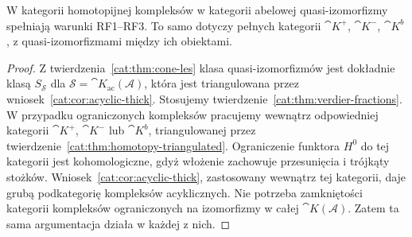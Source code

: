 \begin{wniosek}\label{cat:cor:quasi-iso-fractions}
W kategorii homotopijnej kompleksów w kategorii abelowej quasi-izomorfizmy spełniają warunki RF1--RF3. To samo dotyczy pełnych kategorii $\cat K^+$, $\cat K^-$, $\cat K^b$, z quasi-izomorfizmami między ich obiektami.
\end{wniosek}
\begin{proof}
Z twierdzenia~\ref{cat:thm:cone-les} klasa quasi-izomorfizmów jest dokładnie klasą $S_{\mathcal S}$ dla $\mathcal S=\cat K_{\mathrm{ac}}(\mathcal A)$, która jest triangulowana przez wniosek~\ref{cat:cor:acyclic-thick}. Stosujemy twierdzenie~\ref{cat:thm:verdier-fractions}. W przypadku ograniczonych kompleksów pracujemy wewnątrz odpowiedniej kategorii $\cat K^+$, $\cat K^-$ lub $\cat K^b$, triangulowanej przez twierdzenie~\ref{cat:thm:homotopy-triangulated}. Ograniczenie funktora $H^0$ do tej kategorii jest kohomologiczne, gdyż włożenie zachowuje przesunięcia i trójkąty stożków. Wniosek~\ref{cat:cor:acyclic-thick}, zastosowany wewnątrz tej kategorii, daje grubą podkategorię kompleksów acyklicznych. Nie potrzeba zamkniętości kategorii kompleksów ograniczonych na izomorfizmy w całej $\cat K(\mathcal A)$. Zatem ta sama argumentacja działa w każdej z nich.
\end{proof}


